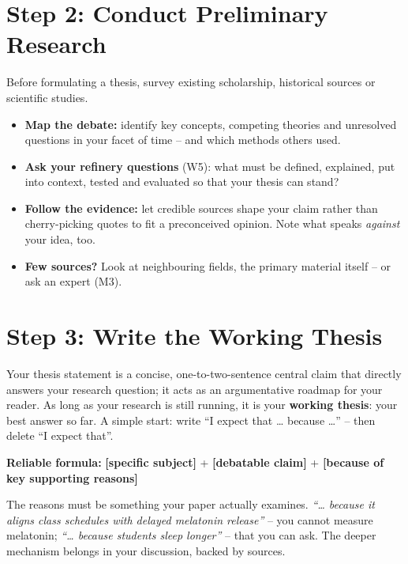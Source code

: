 \section{Step 2: Conduct Preliminary Research}

Before formulating a thesis, survey existing scholarship, historical sources or scientific studies.
\begin{itemize}[leftmargin=1.4em, itemsep=0.05em]
\item \textbf{Map the debate:} identify key concepts, competing theories and unresolved questions in your facet of time – and which methods others used.
\item \textbf{Ask your refinery questions} (W5): what must be defined, explained, put into context, tested and evaluated so that your thesis can stand?
\item \textbf{Follow the evidence:} let credible sources shape your claim rather than cherry-picking quotes to fit a preconceived opinion. Note what speaks \emph{against} your idea, too.
\item \textbf{Few sources?} Look at neighbouring fields, the primary material itself – or ask an expert (M3).
\end{itemize}

\section{Step 3: Write the Working Thesis}

Your thesis statement is a concise, one-to-two-sentence central claim that directly answers your research question; it acts as an argumentative roadmap for your reader. As long as your research is still running, it is your \textbf{working thesis}: your best answer so far. A simple start: write “I expect that … because …” – then delete “I expect that”.

\begin{formel}
\textbf{Reliable formula:} \quad \textbf{[specific subject]} + \textbf{[debatable claim]} + \textbf{[because of key supporting reasons]}\par\vspace{0.4ex}
{\small The reasons must be something your paper actually examines. \emph{“… because it aligns class schedules with delayed melatonin release”} – you cannot measure melatonin; \emph{“… because students sleep longer”} – that you can ask. The deeper mechanism belongs in your discussion, backed by sources.}
\end{formel}

